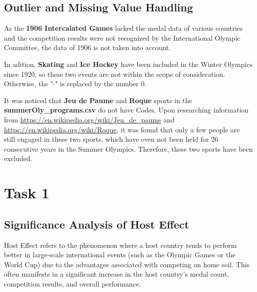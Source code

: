 \documentclass{mcmthesis}
\begin{document}
	\subsection{Outlier and Missing Value Handling}
	As the \textbf{1906 Intercalated Games} lacked the medal data of various countries and the competition results were not recognized by the International Olympic Committee, the data of 1906 is not taken into account.
	
	In adition, \textbf{Skating} and \textbf{Ice Hockey} have been included in the Winter Olympics since 1920, so these two events are not within the scope of consideration. Otherwise, the "$\cdot$" is replaced by the number $0$. 
	
	It was noticed that \textbf{Jeu de Paume} and \textbf{Roque} sports in the {\bf summerOly\_programs.csv} do not have Codes. Upon researching information from {\color{blue}\url{https://en.wikipedia.org/wiki/Jeu_de_paume}} and {\color{blue}\url{https://en.wikipedia.org/wiki/Roque}}, it was found that only a few people are still engaged in these two sports, which have even not been held for 26 consecutive years in the Summer Olympics. Therefore, these two sports have been excluded.
	
	
	
	
	
	
	
	
	
	
	
	
	
	
	
	
	\section{Task 1}
	
	\subsection{Significance Analysis of Host Effect}
	
Host Effect refers to the phenomenon where a host country tends to perform better in large-scale international events (such as the Olympic Games or the World Cup) due to the advantages associated with competing on home soil. This often manifests in a significant increase in the host country's medal count, competition results, and overall performance.
\end{document}
